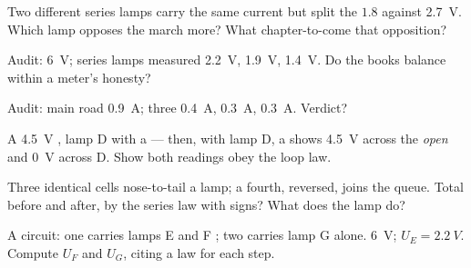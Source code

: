 \begin{exercise}[$\star$]\label{exo:g8:circuit-laws:6}
Two different series lamps carry the same current but split
the  $1.8$ against \qty{2.7}{V}. Which lamp opposes the
march more? What chapter-to-come  that opposition?
\end{exercise}

\begin{exercise}[$\star$]\label{exo:g8:circuit-laws:7}
Audit:  \qty{6}{V}; series lamps measured \qty{2.2}{V},
\qty{1.9}{V}, \qty{1.4}{V}. Do the books balance within a
meter's honesty?
\end{exercise}

\begin{exercise}[$\star$]\label{exo:g8:circuit-laws:8}
Audit: main road \qty{0.9}{A}; three  \qty{0.4}{A},
\qty{0.3}{A}, \qty{0.3}{A}. Verdict?
\end{exercise}

\begin{exercise}[$\star\star$]\label{exo:g8:circuit-laws:9}
A \qty{4.5}{V} , lamp D  with a  ---
then,  with lamp D, a  shows \qty{4.5}{V}
across the \emph{open}  and \qty{0}{V} across D. Show
both readings obey the loop  law.
\end{exercise}

\begin{exercise}[$\star\star$]\label{exo:g8:circuit-laws:10}
Three identical cells nose-to-tail  a lamp; a fourth,
reversed, joins the queue. Total  before and after, by
the series law with signs? What does the lamp do?
\end{exercise}

\begin{exercise}[$\star\star$]\label{exo:g8:circuit-laws:11}
A  circuit:  one carries lamps E and F ;  two carries lamp G alone.  \qty{6}{V};
$U_E = \qty{2.2}{V}$. Compute $U_F$ and $U_G$, citing a law
for each step.
\end{exercise}

